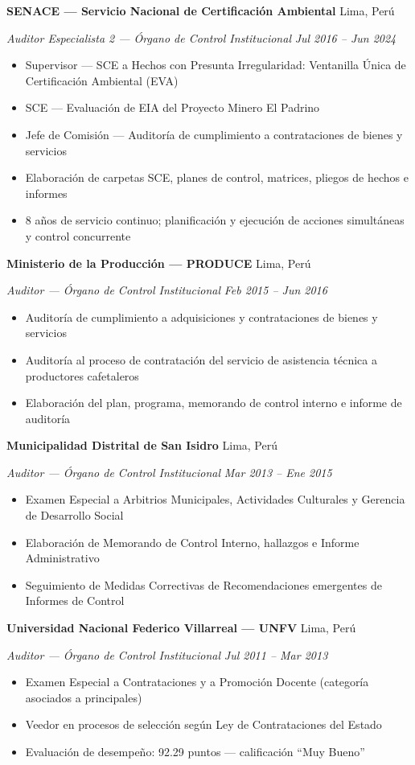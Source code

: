 \documentclass[10pt,letterpaper]{article}
\newcommand{\entry}[4]{%
  \noindent\textbf{#1} \hfill #2 \par\nopagebreak
  \textit{#3} \hfill \textit{#4} \par\nopagebreak
}
\begin{document}
\entry{SENACE — Servicio Nacional de Certificación Ambiental}{Lima, Perú}{Auditor Especialista 2 — Órgano de Control Institucional}{Jul 2016 -- Jun 2024}
\begin{itemize}
  \item Supervisor — SCE a Hechos con Presunta Irregularidad: Ventanilla Única de Certificación Ambiental (EVA)
  \item SCE — Evaluación de EIA del Proyecto Minero El Padrino
  \item Jefe de Comisión — Auditoría de cumplimiento a contrataciones de bienes y servicios
  \item Elaboración de carpetas SCE, planes de control, matrices, pliegos de hechos e informes
  \item 8 años de servicio continuo; planificación y ejecución de acciones simultáneas y control concurrente
\end{itemize}
\vspace{0.2em}

\entry{Ministerio de la Producción — PRODUCE}{Lima, Perú}{Auditor — Órgano de Control Institucional}{Feb 2015 -- Jun 2016}
\begin{itemize}
  \item Auditoría de cumplimiento a adquisiciones y contrataciones de bienes y servicios
  \item Auditoría al proceso de contratación del servicio de asistencia técnica a productores cafetaleros
  \item Elaboración del plan, programa, memorando de control interno e informe de auditoría
\end{itemize}
\vspace{0.2em}

\entry{Municipalidad Distrital de San Isidro}{Lima, Perú}{Auditor — Órgano de Control Institucional}{Mar 2013 -- Ene 2015}
\begin{itemize}
  \item Examen Especial a Arbitrios Municipales, Actividades Culturales y Gerencia de Desarrollo Social
  \item Elaboración de Memorando de Control Interno, hallazgos e Informe Administrativo
  \item Seguimiento de Medidas Correctivas de Recomendaciones emergentes de Informes de Control
\end{itemize}
\vspace{0.2em}

\entry{Universidad Nacional Federico Villarreal — UNFV}{Lima, Perú}{Auditor — Órgano de Control Institucional}{Jul 2011 -- Mar 2013}
\begin{itemize}
  \item Examen Especial a Contrataciones y a Promoción Docente (categoría asociados a principales)
  \item Veedor en procesos de selección según Ley de Contrataciones del Estado
  \item Evaluación de desempeño: 92.29 puntos — calificación ``Muy Bueno''
\end{itemize}
\vspace{0.2em}
\end{document}
